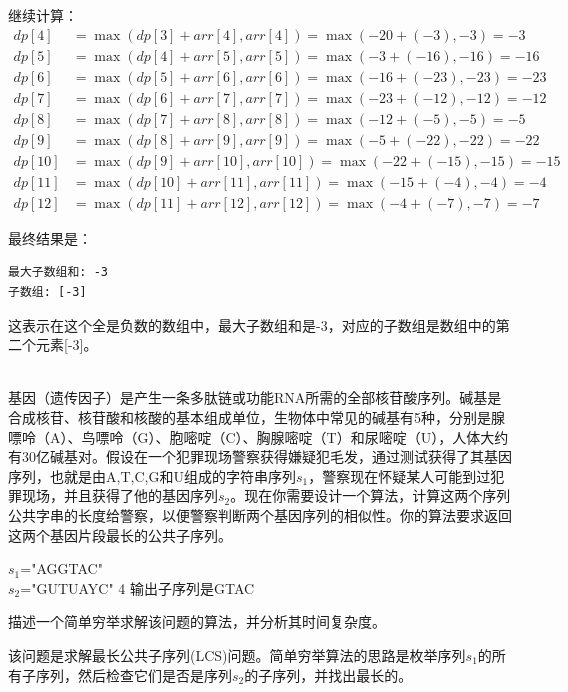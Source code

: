 \documentclass[12pt,twoside]{article}
\begin{document}
\begin{problems}
继续计算：
\begin{align}
dp[4] &= \max(dp[3] + arr[4], arr[4]) = \max(-20 + (-3), -3) = -3 \\
dp[5] &= \max(dp[4] + arr[5], arr[5]) = \max(-3 + (-16), -16) = -16 \\
dp[6] &= \max(dp[5] + arr[6], arr[6]) = \max(-16 + (-23), -23) = -23 \\
dp[7] &= \max(dp[6] + arr[7], arr[7]) = \max(-23 + (-12), -12) = -12 \\
dp[8] &= \max(dp[7] + arr[8], arr[8]) = \max(-12 + (-5), -5) = -5 \\
dp[9] &= \max(dp[8] + arr[9], arr[9]) = \max(-5 + (-22), -22) = -22 \\
dp[10] &= \max(dp[9] + arr[10], arr[10]) = \max(-22 + (-15), -15) = -15 \\
dp[11] &= \max(dp[10] + arr[11], arr[11]) = \max(-15 + (-4), -4) = -4 \\
dp[12] &= \max(dp[11] + arr[12], arr[12]) = \max(-4 + (-7), -7) = -7 
\end{align}

最终结果是：
\begin{verbatim}
最大子数组和: -3
子数组: [-3]
\end{verbatim}

这表示在这个全是负数的数组中，最大子数组和是-3，对应的子数组是数组中的第二个元素[-3]。

\eparts



\\
基因（遗传因子）是产生一条多肽链或功能RNA所需的全部核苷酸序列。碱基是合成核苷、核苷酸和核酸的基本组成单位，生物体中常见的碱基有5种，分别是腺嘌呤（A）、鸟嘌呤（G）、胞嘧啶（C）、胸腺嘧啶（T）和尿嘧啶（U），人体大约有30亿碱基对。假设在一个犯罪现场警察获得嫌疑犯毛发，通过测试获得了其基因序列，也就是由A,T,C,G和U组成的字符串序列$s_1$，警察现在怀疑某人可能到过犯罪现场，并且获得了他的基因序列$s_2$。现在你需要设计一个算法，计算这两个序列公共字串的长度给警察，以便警察判断两个基因序列的相似性。你的算法要求返回这两个基因片段最长的公共子序列。

\begin{probexamples}
   {$s_1$="AGGTAC"\\$s_2$="GUTUAYC"}
   {4}
   {输出子序列是GTAC}
\end{probexamples}
\bparts
\ppart 描述一个简单穷举求解该问题的算法，并分析其时间复杂度。

该问题是求解最长公共子序列(LCS)问题。简单穷举算法的思路是枚举序列$s_1$的所有子序列，然后检查它们是否是序列$s_2$的子序列，并找出最长的。


\end{problems}
\end{document}
